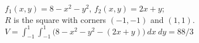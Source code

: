 {$f_1(x,y) = 8-x^2-y^2$, $f_2(x,y) = 2x+y$;\\
 $R$ is the square with corners $(-1,-1)$ and $(1,1)$.
}
{$V = \int_{-1}^1\int_{-1}^1 \big(8-x^2-y^2-(2x+y)\big)\ dx\ dy = 88/3$
}
